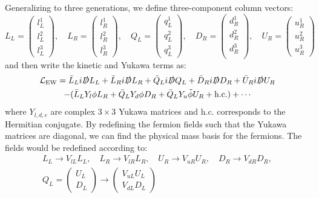Generalizing to three generations, we define three-component column vectors:
\begin{equation}
  L_L = \begin{pmatrix}
    l_L^1 \\
    l_L^2 \\
    l_L^3 
  \end{pmatrix}, \quad
  L_R = \begin{pmatrix}
    l_R^1 \\
    l_R^2 \\
    l_R^3 
  \end{pmatrix}, \quad
  Q_L = \begin{pmatrix}
    q_L^1 \\
    q_L^2 \\
    q_L^3
  \end{pmatrix}, \quad
  D_R = \begin{pmatrix}
    d_R^1 \\
    d_R^2 \\
    d_R^3 \\
  \end{pmatrix}, \quad
  U_R = \begin{pmatrix}
    u_R^1 \\
    u_R^2 \\
    u_R^3
  \end{pmatrix}
\end{equation}
and then write the kinetic and Yukawa terms as:
\begin{equation}
  \begin{gathered}
    \mathcal{L}_\mathrm{EW} = \bar{L}_L i \slashed{D} L_L + \bar{L}_R i \slashed{D} L_R + \bar{Q}_L i \slashed{D} Q_L + \bar{D}_R i \slashed{D} D_R + \bar{U}_R i \slashed{D} U_R \\
  - (\bar{L}_L Y_l \phi L_R + \bar{Q}_L Y_d \phi D_R + \bar{Q}_L Y_u \tilde{\phi} U_R + \text{h.c.}) + \cdots
  \end{gathered}
  \label{eq:electoweak_fermion_terms}
\end{equation}
where $Y_{l,d,e}$ are complex $3 \times 3$ Yukawa matrices and $\text{h.c.}$ corresponds to the Hermitian conjugate. By redefining the fermion fields such that the Yukawa matrices are diagonal, we can find the physical mass basis for the fermions. The fields would be redefined according to:
\begin{equation}
  \begin{gathered}
    L_L \to V_{lL} L_L, \quad L_R \to V_{lR} L_R, \quad U_R \to V_{uR}  U_R, \quad  D_R \to V_{dR} D_R, \\
  Q_L = \begin{pmatrix}
    U_L \\
    D_L   
  \end{pmatrix} \to 
  \begin{pmatrix}
    V_{uL} U_L \\
    V_{dL} D_L
  \end{pmatrix}
  \end{gathered}
  \label{eq:fermion_redefinitions}
\end{equation}

